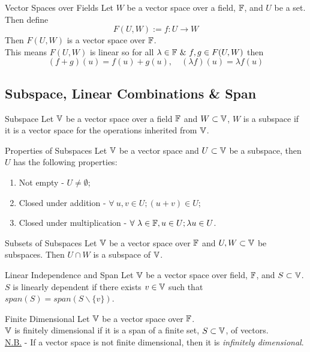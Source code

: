 \documentclass[11pt,a4paper]{article}
\begin{document}
\subtitle{Theorem 7.8 - }{Vector Spaces over Fields}
Let $W$ be a vector space over a field, $\mathbb{F}$, and $U$ be a set. Then define
$$F(U, W) := {f : U \to W}$$
Then $F(U, W)$ is a vector space over $\mathbb{F}$.\\
This means $F(U, W)$ is linear so for all $\lambda \in \field\ \&\ f, g \in F(U, W)$ then
$$(f + g)(u) = f(u) + g(u),\quad (\lambda f)(u) = \lambda f(u)$$

\subsection{Subspace, Linear Combinations \& Span}

\subtitle{Definition 7.9 - }{Subspace}
Let $\mathbb{V}$ be a vector space over a field $\mathbb{F}$ and $W \subset \mathbb{V}$, $W$ is a subspace if it is a vector space for the operations inherited from $\mathbb{V}$.\\

\subtitle{Theorem 7.10 - }{Properties of Subspaces}
Let $\mathbb{V}$ be a vector space and $U \subset \mathbb{V}$ be a subspace, then $U$ has the following properties:
\begin{enumerate}[label=\roman*)]
  \item Not empty - $U \not = \emptyset$;
  \item Closed under addition - $\forall\ u, v \in U; (u + v) \in U$;
  \item Closed under multiplication - $\forall\ \lambda \in \field, u \in U; \lambda u \in U$.
\end{enumerate}

\subtitle{Theorem 7.11 - }{Subsets of Subspaces}
Let $\mathbb{V}$ be a vector space over $\mathbb{F}$ and $U, W \subset \mathbb{V}$ be subspaces. Then $U \cap W$ is a subspace of $\mathbb{V}$.\\

\subtitle{Remark 7.12 - }{Linear Independence and Span}
Let $\mathbb{V}$ be a vector space over field, $\mathbb{F}$, and $S \subset \mathbb{V}$.\\
$S$ is linearly dependent if there exists $v \in \mathbb{V}$ such that $span(S) = span(S\backslash\{v\})$.\\

\subtitle{Definition 7.13 - }{Finite Dimensional}
Let $\mathbb{V}$ be a vector space over $\mathbb{F}$.\\
$\mathbb{V}$ is finitely dimensional if it is a span of a finite set, $S \subset \mathbb{V}$, of vectors.\\
\underline{N.B.} - If a vector space is not finite dimensional, then it is \textit{infinitely dimensional}.\\
\end{document}
